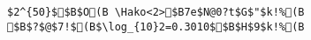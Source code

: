 \begin{verbatim}
$2^{50}$$B$O(B \Hako<2>$B7e$N@0?t$G$"$k!%(B
$B$?$@$7!$(B$\log_{10}2=0.3010$$B$H$9$k!%(B
\end{verbatim}
